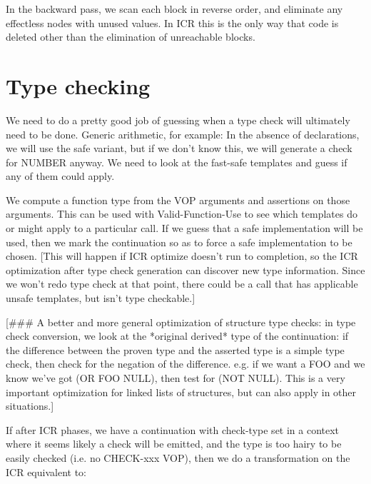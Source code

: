 In the backward pass, we scan each block in reverse order, and
eliminate any effectless nodes with unused values.  In ICR this is the
only way that code is deleted other than the elimination of unreachable blocks.


\chapter{Type checking}


We need to do a pretty good job of guessing when a type check will ultimately
need to be done.  Generic arithmetic, for example: In the absence of
declarations, we will use the safe variant, but if we don't know this, we
will generate a check for NUMBER anyway.  We need to look at the fast-safe
templates and guess if any of them could apply.

We compute a function type from the VOP arguments
and assertions on those arguments.  This can be used with Valid-Function-Use
to see which templates do or might apply to a particular call.  If we guess
that a safe implementation will be used, then we mark the continuation so as to
force a safe implementation to be chosen.  [This will happen if ICR optimize
doesn't run to completion, so the ICR optimization after type check generation
can discover new type information.  Since we won't redo type check at that
point, there could be a call that has applicable unsafe templates, but isn't
type checkable.]

[\#\#\# A better and more general optimization of structure type checks: in type
check conversion, we look at the *original derived* type of the continuation:
if the difference between the proven type and the asserted type is a simple
type check, then check for the negation of the difference.  e.g. if we want a
FOO and we know we've got (OR FOO NULL), then test for (NOT NULL).  This is a
very important optimization for linked lists of structures, but can also apply
in other situations.]

If after ICR phases, we have a continuation with check-type set in a context
where it seems likely a check will be emitted, and the type is too 
hairy to be easily checked (i.e. no CHECK-xxx VOP), then we do a transformation
on the ICR equivalent to:

